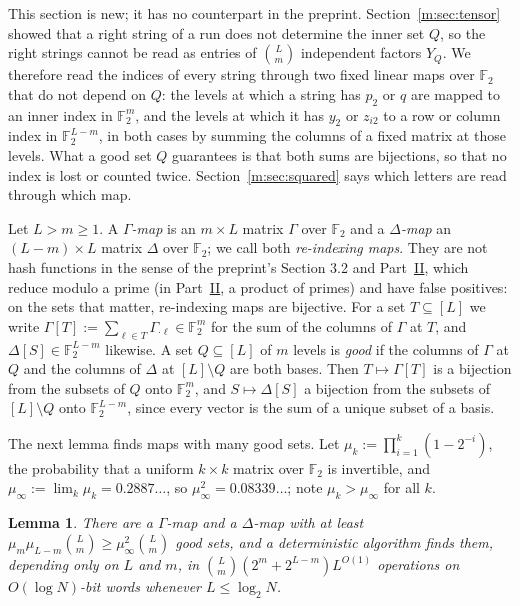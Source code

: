\documentclass[11pt]{article}
\newtheorem{lemma}[theorem]{Lemma}
\theoremstyle{definition}
\theoremstyle{remark}
\newcommand{\F}{\mathbb{F}_2}
\begin{document}
This section is new; it has no counterpart in the preprint. Section~\ref{m:sec:tensor} showed that a right string of a run does not determine the inner set $Q$, so the right strings cannot be read as entries of $\binom Lm$ independent factors $Y_Q$. We therefore read the indices of every string through two fixed linear maps over $\F$ that do not depend on $Q$: the levels at which a string has $p_2$ or $q$ are mapped to an inner index in $\F^m$, and the levels at which it has $y_2$ or $z_{i2}$ to a row or column index in $\F^{L-m}$, in both cases by summing the columns of a fixed matrix at those levels. What a good set $Q$ guarantees is that both sums are bijections, so that no index is lost or counted twice. Section~\ref{m:sec:squared} says which letters are read through which map.

Let $L>m\ge1$. A \emph{$\Gamma$-map} is an $m\times L$ matrix $\Gamma$ over $\F$ and a \emph{$\Delta$-map} an $(L-m)\times L$ matrix $\Delta$ over $\F$; we call both \emph{re-indexing maps}. They are not hash functions in the sense of the preprint's Section 3.2 and Part~\hyperref[m:partII]{II}, which reduce modulo a prime (in Part~\hyperref[m:partII]{II}, a product of primes) and have false positives: on the sets that matter, re-indexing maps are bijective. For a set $T\subseteq[L]$ we write $\Gamma[T]:=\sum_{\ell\in T}\Gamma_{\cdot\ell}\in\F^m$ for the sum of the columns of $\Gamma$ at $T$, and $\Delta[S]\in\F^{L-m}$ likewise. A set $Q\subseteq[L]$ of $m$ levels is \emph{good} if the columns of $\Gamma$ at $Q$ and the columns of $\Delta$ at $[L]\setminus Q$ are both bases. Then $T\mapsto\Gamma[T]$ is a bijection from the subsets of $Q$ onto $\F^m$, and $S\mapsto\Delta[S]$ a bijection from the subsets of $[L]\setminus Q$ onto $\F^{L-m}$, since every vector is the sum of a unique subset of a basis.

The next lemma finds maps with many good sets. Let $\mu_k:=\prod_{i=1}^k(1-2^{-i})$, the probability that a uniform $k\times k$ matrix over $\F$ is invertible, and $\mu_\infty:=\lim_k\mu_k=0.2887\ldots$, so $\mu_\infty^2=0.08339\ldots$; note $\mu_k>\mu_\infty$ for all $k$.

\begin{lemma}\label{m:lem:hashes}
There are a $\Gamma$-map and a $\Delta$-map with at least $\mu_m\mu_{L-m}\binom Lm\ge\mu_\infty^2\binom Lm$ good sets, and a deterministic algorithm finds them, depending only on $L$ and $m$, in $\binom Lm(2^m+2^{L-m})L^{O(1)}$ operations on $O(\log N)$-bit words whenever $L\le\log_2N$.
\end{lemma}
\end{document}
